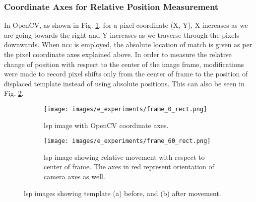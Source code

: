         
    \subsubsection*{Coordinate Axes for Relative Position Measurement}
        In OpenCV, as shown in Fig. \ref{subfig:frame_0_rect.png}, for a pixel coordinate (X, Y), X increases as we are going towards the right and Y increases as we traverse through the pixels downwards. When \gls{ncc} is employed, the absolute location of match is given as per the pixel coordinate axes explained above. In order to measure the relative change of position with respect to the center of the image frame, modifications were made to record pixel shifts only from the center of frame to the position of displaced template instead of using absolute positions. This can also be seen in Fig. \ref{subfig:frame_60_rect.png}.

        \begin{figure}[ht]
            \centering
            \begin{subfigure}{0.49\textwidth}
                \texttt{[image: images/e\_experiments/frame\_0\_rect.png]}
                \caption{\gls{lsp} image with OpenCV coordinate axes.}
                \label{subfig:frame_0_rect.png}
            \end{subfigure}
            \begin{subfigure}{0.49\textwidth}
                \texttt{[image: images/e\_experiments/frame\_60\_rect.png]}
                \caption{\gls{lsp} image showing relative movement with respect to center of frame. The axes in red represent orientation of camera axes as well.}
                \label{subfig:frame_60_rect.png}
            \end{subfigure}
            \caption{\gls{lsp} images showing template (a) before, and (b) after movement.}
            \label{fig:coord_axes_frame}
        \end{figure}

